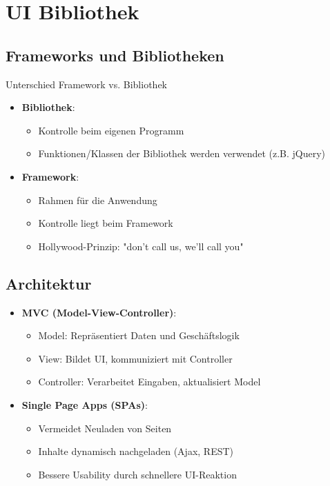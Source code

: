 \section{UI Bibliothek}

\subsection{Frameworks und Bibliotheken}
\begin{KR}{Unterschied Framework vs. Bibliothek}
    \begin{itemize}
        \item \textbf{Bibliothek}: 
            \begin{itemize}
                \item Kontrolle beim eigenen Programm
                \item Funktionen/Klassen der Bibliothek werden verwendet (z.B. jQuery)
            \end{itemize}
        \item \textbf{Framework}: 
            \begin{itemize}
                \item Rahmen für die Anwendung 
                \item Kontrolle liegt beim Framework
                \item Hollywood-Prinzip: "don't call us, we'll call you"
            \end{itemize}
    \end{itemize}
\end{KR}

\subsection{Architektur}
\begin{itemize}
    \item \textbf{MVC (Model-View-Controller)}:
        \begin{itemize}
            \item Model: Repräsentiert Daten und Geschäftslogik
            \item View: Bildet UI, kommuniziert mit Controller
            \item Controller: Verarbeitet Eingaben, aktualisiert Model
        \end{itemize}
    \item \textbf{Single Page Apps (SPAs)}:
        \begin{itemize}
            \item Vermeidet Neuladen von Seiten
            \item Inhalte dynamisch nachgeladen (Ajax, REST)
            \item Bessere Usability durch schnellere UI-Reaktion
        \end{itemize}
\end{itemize}

